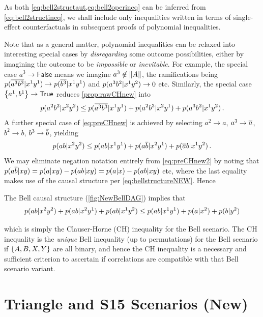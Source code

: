 As both \cref{eq:bell2structaut,eq:bell2operineq} can be inferred from \cref{eq:bell2structineq}, we shall include only inequalities written in terms of single-effect counterfactuals in subsequent proofs of polynomial inequalities.



Note that as a general matter, polynomial inequalities can be relaxed into interesting special cases by \emph{disregarding} some outcome possibilities, either by imagining the outcome to be \emph{impossible} or \emph{inevitable}. For example, the special case $a^3\to \mathsf{False}$ means we imagine  $a^3\not\in \lVert A\rVert$, the ramifications being $p\lparen\overline{a^3} \overline{b^3}|x^1 y^1\rparen\to p\lparen\overline{b^3}|x^1 y^1\rparen$ and $p\lparen a^3 b^2|x^1 y^2\rparen\to 0$ etc. Similarly, the special case $\left\lbrace a^1,b^1\right\rbrace\to \mathsf{True}$ reduces \cref{prop:rawCHnew} into
\begin{align}\label{eq:preCHnew}
p\lparen a^2 b^2|x^2 y^2\rparen
\leq
{
p\lparen\ensuremath{\overline{a^3}} \ensuremath{\overline{b^3}}|x^1 y^1\rparen
+p\lparen a^2 b^3|x^2 y^1\rparen
+p\lparen a^3 b^2|x^1 y^2\rparen
}\,.
\end{align}
A further special case of \cref{eq:preCHnew} is achieved by selecting $a^2\to a$, $a^3\to \overline{a}$, $b^2\to b$, $b^3\to \overline{b}$, yielding
\begin{align}\label{eq:preCHnew2}
p\lparen a b|x^2 y^2\rparen
\leq
{
p\lparen a b|x^1 y^1\rparen
+p\lparen a \ensuremath{\overline{b}}|x^2 y^1\rparen
+p\lparen\ensuremath{\overline{a}} b|x^1 y^2\rparen
}\,.
\end{align}
We may eliminate negation notation entirely from \cref{eq:preCHnew2} by noting that $p\lparen a \overline{b} | x y\rparen = p\lparen a | x y\rparen-p\lparen a b | x y\rparen = p\lparen a | x\rparen-p\lparen a b | x y\rparen$ etc, where the last equality makes use of the causal structure per \cref{eq:bellstructureNEW}. Hence
\begin{prop}\label{prop:CHnew}
The Bell causal structure (\cref{fig:NewBellDAG}) implies that
\begin{align*}
p\lparen a b|x^2 y^2\rparen+p\lparen a b|x^2 y^1\rparen+p\lparen a b|x^1 y^2\rparen
\leq
{
p\lparen a b|x^1 y^1\rparen
+p\lparen a |x^2\rparen
+p\lparen b |y^2\rparen
}
\end{align*}
\end{prop}
which is simply the Clauser-Horne (CH) inequality \cite{CHInequality} for the Bell scenario. The CH inequality is the \emph{unique} Bell inequality (up to permutations) for the Bell scenario if $\left\lbrace A,B,X,Y\right\rbrace$ are all binary, and hence the CH inequality is a necessary and sufficient criterion to ascertain if correlations are compatible with that Bell scenario variant.





\section{Triangle and S15 Scenarios  (New)}

